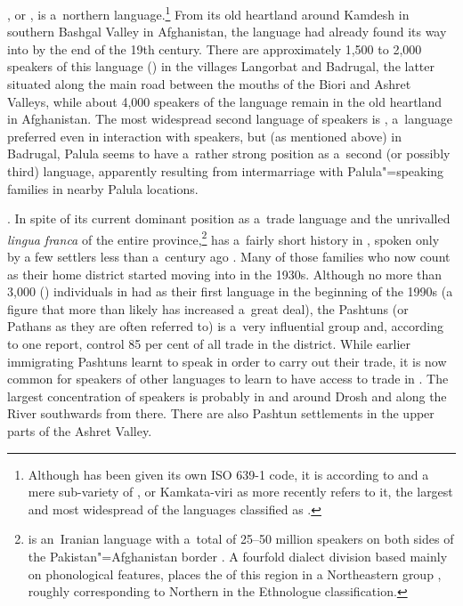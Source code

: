 \textbf{\iliShekhani [xvi]}, or \iliKamviri, is a~northern \iliNuristani language.\footnote{Although \iliKamviri has been given its own ISO 639-1 code, it is according to \citet[298]{strand1973} and \citet[104]{degener2002} a mere sub-variety of \iliKati [bsh], or Kamkata-viri as \citet{strand2001} more recently refers to it, the largest and most widespread of the languages classified as \iliNuristani.} From its old heartland around Kamdesh in southern Bashgal Valley in Afghanistan, the language had already found its way into \iliChitral by the end of the 19th century. There are approximately 1,500 to 2,000 speakers of this language (\citealt{decker1992a}) in the villages Langorbat and Badrugal, the latter situated along the main road between the mouths of the Biori and Ashret Valleys, while about 4,000 speakers of the language remain in the old heartland in Afghanistan. The most widespread second language of \iliShekhani speakers is \iliPashto, a~language preferred even in interaction with \iliKhowar speakers, but (as mentioned above) in Badrugal, Palula seems to have a~rather strong position as a~second (or possibly third) language, apparently resulting from intermarriage with Palula"=speaking families in nearby Palula locations.


\textbf{\iliPashto [pbu]}. In spite of its current dominant position as a~trade language and the unrivalled \textit{lingua franca} of the entire province,\footnote{\iliPashto is an~Iranian language with a~total of 25--50 million speakers on both sides of the Pakistan"=Afghanistan border \citep[7--8]{david2013}. A fourfold dialect division based mainly on phonological features, places the \iliPashto of this region in a Northeastern group \citep[739--740]{elfenbein1997}, roughly corresponding to Northern \iliPashto [pbu] in the Ethnologue \citep{ethnologue2015} classification.} \iliPashto has a~fairly short history in \iliChitral, spoken only by a few settlers less than a~century ago \citep[67]{morgenstierne1932}. Many of those families who now count \iliChitral as their home district started moving into \iliChitral in the 1930s. Although no more than 3,000 (\citealt{decker1992a}) individuals in \iliChitral had \iliPashto as their first language in the beginning of the 1990s (a figure that more than likely has increased a~great deal), the Pashtuns (or Pathans as they are often referred to) is a~very influential group and, according to one report, control 85 per cent of all trade in the district. While earlier immigrating Pashtuns learnt to speak \iliKhowar in order to carry out their trade, it is now common for speakers of other languages to learn \iliPashto to have access to trade in \iliChitral. The largest concentration of \iliPashto speakers is probably in and around Drosh and along the \iliKunar River southwards from there. There are also Pashtun settlements in the upper parts of the Ashret Valley. 


